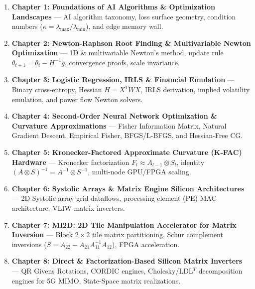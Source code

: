 \documentclass[11pt,a4paper,oneside]{book}
\begin{document}
\begin{conceptbox}
\begin{enumerate}[leftmargin=*]
    \item \textbf{Chapter 1: Foundations of AI Algorithms \& Optimization Landscapes} --- AI algorithm taxonomy, loss surface geometry, condition numbers ($\kappa = \lambda_{\max}/\lambda_{\min}$), and edge memory wall.
    \item \textbf{Chapter 2: Newton-Raphson Root Finding \& Multivariable Newton Optimization} --- 1D \& multivariable Newton's method, update rule $\theta_{t+1} = \theta_t - H^{-1}g$, convergence proofs, scale invariance.
    \item \textbf{Chapter 3: Logistic Regression, IRLS \& Financial Emulation} --- Binary cross-entropy, Hessian $H = X^T W X$, IRLS derivation, implied volatility emulation, and power flow Newton solvers.
    \item \textbf{Chapter 4: Second-Order Neural Network Optimization \& Curvature Approximations} --- Fisher Information Matrix, Natural Gradient Descent, Empirical Fisher, BFGS/L-BFGS, and Hessian-Free CG.
    \item \textbf{Chapter 5: Kronecker-Factored Approximate Curvature (K-FAC) Hardware} --- Kronecker factorization $F_l \approx A_{l-1} \otimes S_l$, identity $(A \otimes S)^{-1} = A^{-1} \otimes S^{-1}$, multi-node GPU/FPGA scaling.
    \item \textbf{Chapter 6: Systolic Arrays \& Matrix Engine Silicon Architectures} --- 2D Systolic array grid dataflows, processing element (PE) MAC architecture, VLIW matrix inverters.
    \item \textbf{Chapter 7: MI2D: 2D Tile Manipulation Accelerator for Matrix Inversion} --- Block $2\times 2$ tile matrix partitioning, Schur complement inversions ($S = A_{22} - A_{21} A_{11}^{-1} A_{12}$), FPGA acceleration.
    \item \textbf{Chapter 8: Direct \& Factorization-Based Silicon Matrix Inverters} --- QR Givens Rotations, CORDIC engines, Cholesky/LDL$^T$ decomposition engines for 5G MIMO, State-Space matrix realizations.
\end{enumerate}
\end{conceptbox}
\end{document}
